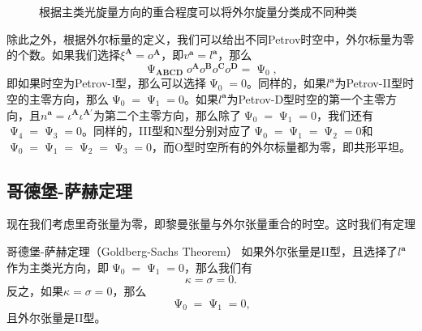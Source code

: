 \begin{figure}[h]
	\centering
	
	\caption{根据主类光旋量方向的重合程度可以将外尔旋量分类成不同种类}
	\label{fig:Petrov}
\end{figure}

除此之外，根据外尔标量的定义，我们可以给出不同Petrov时空中，外尔标量为零的个数。如果我们选择$\xi ^{\boldsymbol{A}} =o^{\boldsymbol{A}}$，即$v^{\boldsymbol{a}} =l^{\boldsymbol{a}}$，那么
\begin{equation*}
	\upPsi _{\boldsymbol{ABCD}} o^{\boldsymbol{A}} o^{\boldsymbol{B}} o^{\boldsymbol{C}} o^{\boldsymbol{D}} =\upPsi _{0} ,
\end{equation*}
即如果时空为Petrov-I型，那么可以选择$\upPsi _{0} =0$。同样的，如果$l^{\boldsymbol{a}}$为Petrov-II型时空的主零方向，那么$\upPsi _{0} =\upPsi _{1} =0$。如果$l^{\boldsymbol{a}}$为Petrov-D型时空的第一个主零方向，且$n^{\boldsymbol{a}} =\iota ^{\boldsymbol{A}} \iota ^{\boldsymbol{A} '}$为第二个主零方向，那么除了$\upPsi _{0} =\upPsi _{1} =0$，我们还有$\upPsi _{4} =\upPsi _{3} =0$。同样的，III型和N型分别对应了$\upPsi _{0} =\upPsi _{1} =\upPsi _{2} =0$和$\upPsi _{0} =\upPsi _{1} =\upPsi _{2} =\upPsi _{3} =0$，而O型时空所有的外尔标量都为零，即共形平坦。


\subsection{哥德堡-萨赫定理}

现在我们考虑里奇张量为零，即黎曼张量与外尔张量重合的时空。这时我们有定理\parencite{chandrasekhar1998mathematical,goldberg2009republication}

\begin{them}[label={Goldberg-Sachs Theorem}]{哥德堡-萨赫定理（Goldberg-Sachs Theorem）}
	如果外尔张量是II型，且选择了$l^{\boldsymbol{a}}$作为主类光方向，即$\upPsi _{0} =\upPsi _{1} =0$，那么我们有
	\begin{equation*}
		\kappa =\sigma =0.
	\end{equation*}
	反之，如果$\kappa =\sigma =0$，那么
	\begin{equation*}
		\upPsi _{0} =\upPsi _{1} =0,
	\end{equation*}
	且外尔张量是II型。
\end{them}

